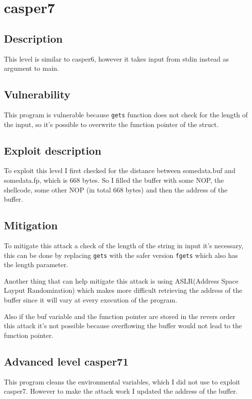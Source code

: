 \documentclass[a4paper,12pt]{article}
\begin{document}
\section{casper7}
\subsection{Description}
This level is similar to casper6, however it takes input from stdin instead as argument to main.


\subsection{Vulnerability}
This program is vulnerable because \texttt{gets} function does not check for the length of the input, so it's possible to overwrite the function pointer of the struct.

\subsection{Exploit description} 

To exploit this level I first checked for the distance between somedata.buf and somedata.fp, which is 668 bytes.
So I filled the buffer with some NOP, the shellcode, some other NOP (in total 668 bytes) and then the address of the buffer.



\subsection{Mitigation}

To mitigate this attack a check of the length of the string in input it's necessary, this can be done by replacing \texttt{gets} with the safer version \texttt{fgets} which also has the length parameter.

Another thing that can help mitigate this attack is using ASLR(Address Space Layput Randomization)
which makes more difficult retrieving the address of the buffer since it will vary at every execution of the program.

Also if the buf variable and the function pointer are stored in the revers order this attack it's not possible because overflowing the buffer would not lead to the function pointer.

\subsection{Advanced level casper71}
This program cleans the environmental variables, which I did not use to exploit casper7. However to make the attack work I updated the address of the buffer.
\end{document}

